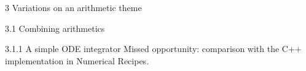\documentclass[12pt]{PalisadesLakesBook}
\begin{document}
\begin{plSection}{3 Variations on an arithmetic theme}
\begin{plSection}{3.1 Combining arithmetics}
\begin{plSection}{3.1.1 A simple ODE integrator}
\NOTE Missed opportunity: comparison with the C++ implementation
in  Numerical Recipes.

% 
% 
% 
% 
% 


\end{plSection}
\end{plSection}
\end{plSection}
\end{document}
